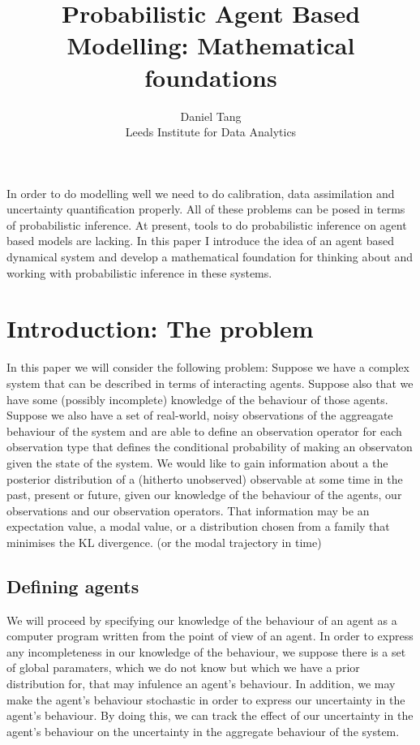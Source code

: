 \documentclass[letterpaper,twocolumn,10pt]{article}
\begin{document}
\title{\Large \bf Probabilistic Agent Based Modelling: Mathematical foundations}

\author{
{\rm Daniel Tang}\\
Leeds Institute for Data Analytics
}

\maketitle


\abstract
In order to do modelling well we need to do calibration, data assimilation and uncertainty quantification properly. All of these problems can be posed in terms of probabilistic inference. At present, tools to do probabilistic inference on agent based models are lacking. In this paper I introduce the idea of an agent based dynamical system and develop a mathematical foundation for thinking about and working with probabilistic inference in these systems.

\section{Introduction: The problem}

In this paper we will consider the following problem: Suppose we have a complex system that can be described in terms of interacting agents. Suppose also that we have some (possibly incomplete) knowledge of the behaviour of those agents. Suppose we also have a set of real-world, noisy observations of the aggreagate behaviour of the system and are able to define an observation operator for each observation type that defines the conditional probability of making an observaton given the state of the system. We would like to gain information about a the posterior distribution of a (hitherto unobserved) observable at some time in the past, present or future, given our knowledge of the behaviour of the agents, our observations and our observation operators. That information may be an expectation value, a modal value, or a distribution chosen from a family that minimises the KL divergence. (or the modal trajectory in time)

\subsection{Defining agents}
We will proceed by specifying our knowledge of the behaviour of an agent as a computer program written from the point of view of an agent. In order to express any incompleteness in our knowledge of the behaviour, we suppose there is a set of global paramaters, which we do not know but which we have a prior distribution for, that may  infulence an agent's behaviour. In addition, we may make the agent's behaviour stochastic in order to express our uncertainty in the agent's behaviour. By doing this, we can track the effect of our uncertainty in the agent's behaviour on the uncertainty in the aggregate behaviour of the system.
\end{document}
